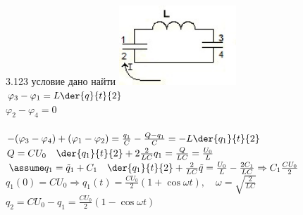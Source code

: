 \testCom
{%
	3.123
}
{%
	условие
}
{%
	дано
}
{%
	найти
}
{%
	\includegraphics[height=30mm]{3_123.jpg}\\
	$\varphi_3 - \varphi_1 = L \der{q}{t}{2}$\\
	$\varphi_2 - \varphi_4 = 0$\\\\
	$-(\varphi_3 - \varphi_4) + (\varphi_1 - \varphi_2) = \frac{q_1}{C} - \frac{Q - q_1}{C} = - L \der{q_1}{t}{2}$\\
	$Q = C U_0 \quad \der{q_1}{t}{2} + 2 \frac{2}{LC} q_1 = \frac{Q}{LC} = \frac{U_0}{L}$\\
	$\assume q_1 = \tilde q_1 + C_1 \quad \der{q_1}{t}{2} + \frac{2}{LC} \tilde q = \frac{U_0}{L} - \frac{2 C_1}{LC} \Rightarrow C_1 \frac{CU_0}{2}$\\
	$q_1(0) = C U_0 \Rightarrow q_1(t) = \frac{C U_0}{2} (1 + \cos \omega t), \quad \omega = \sqrt{\frac{2}{LC}}$\\
	$q_2 = C U_0 - q_1 = \frac{CU_0}{2} (1 - \cos \omega t)$\\
}

